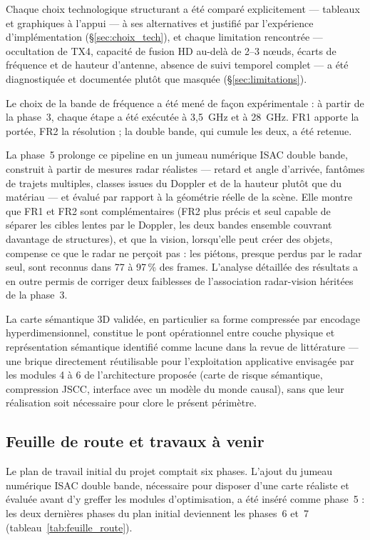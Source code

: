 \documentclass[12pt,a4paper,titlepage]{article}
\begin{document}
Chaque choix technologique structurant a été comparé explicitement --- tableaux et graphiques à l'appui --- à ses alternatives et justifié par l'expérience d'implémentation (\S\ref{sec:choix_tech}), et chaque limitation rencontrée --- occultation de TX4, capacité de fusion HD au-delà de 2--3 n\oe uds, écarts de fréquence et de hauteur d'antenne, absence de suivi temporel complet --- a été diagnostiquée et documentée plutôt que masquée (\S\ref{sec:limitations}).

Le choix de la bande de fréquence a été mené de façon expérimentale : à partir de la phase~3, chaque étape a été exécutée à 3,5~GHz et à 28~GHz. FR1 apporte la portée, FR2 la résolution ; la double bande, qui cumule les deux, a été retenue.

La phase~5 prolonge ce pipeline en un jumeau numérique ISAC double bande, construit à partir de mesures radar réalistes --- retard et angle d'arrivée, fantômes de trajets multiples, classes issues du Doppler et de la hauteur plutôt que du matériau --- et évalué par rapport à la géométrie réelle de la scène. Elle montre que FR1 et FR2 sont complémentaires (FR2 plus précis et seul capable de séparer les cibles lentes par le Doppler, les deux bandes ensemble couvrant davantage de structures), et que la vision, lorsqu'elle peut créer des objets, compense ce que le radar ne perçoit pas : les piétons, presque perdus par le radar seul, sont reconnus dans 77 à 97\,\% des frames. L'analyse détaillée des résultats a en outre permis de corriger deux faiblesses de l'association radar-vision héritées de la phase~3.

La carte sémantique 3D validée, en particulier sa forme compressée par encodage hyperdimensionnel, constitue le pont opérationnel entre couche physique et représentation sémantique identifié comme lacune dans la revue de littérature --- une brique directement réutilisable pour l'exploitation applicative envisagée par les modules 4 à 6 de l'architecture proposée (carte de risque sémantique, compression JSCC, interface avec un modèle du monde causal), sans que leur réalisation soit nécessaire pour clore le présent périmètre.

\subsection*{Feuille de route et travaux à venir}

Le plan de travail initial du projet comptait six phases. L'ajout du jumeau numérique ISAC double bande, nécessaire pour disposer d'une carte réaliste et évaluée avant d'y greffer les modules d'optimisation, a été inséré comme phase~5 : les deux dernières phases du plan initial deviennent les phases~6 et~7 (tableau~\ref{tab:feuille_route}).
\end{document}
